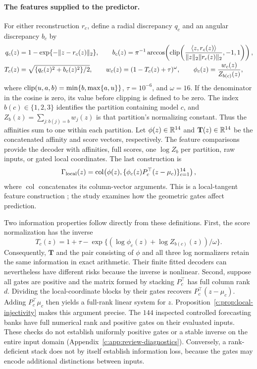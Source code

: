 \paragraph{The features supplied to the predictor.}
For either reconstruction $r_c$, define a radial discrepancy $q_c$ and an
angular discrepancy $b_c$ by
\begin{align}
 q_c(z)&=1-\exp\{-\|z-r_c(z)\|_2\},\qquad
 b_c(z)=\pi^{-1}\arccos\!\left(\operatorname{clip}\!\left(
 \frac{\langle z,r_c(z)\rangle}{\|z\|_2\|r_c(z)\|_2},-1,1\right)\right),
 \nonumber\\[-2pt]
 T_c(z)&=\sqrt{\{q_c(z)^2+b_c(z)^2\}/2},\qquad
 w_c(z)=(1-T_c(z)+\tau)^\omega,\qquad
 \phi_c(z)=\frac{w_c(z)}{Z_{b(c)}(z)},\label{c:eq:phi}
\end{align}
where $\operatorname{clip}(u,a,b)=\min\{b,\max\{a,u\}\}$, $\tau=10^{-6}$, and
$\omega=16$. If the denominator in the cosine is zero, its value before
clipping is defined to be zero. The index $b(c)\in\{1,2,3\}$ identifies
the partition containing model $c$, and
$Z_b(z)=\sum_{j:b(j)=b}w_j(z)$ is that partition's normalizing constant.
Thus the affinities sum to one within each partition. Let
$\phi(z)\in\mathbb{R}^{14}$ and $\mathbf T(z)\in\mathbb{R}^{14}$ be the concatenated
affinity and score vectors, respectively. The feature comparisons provide
the decoder with affinities, full scores, one $\log Z_b$ per partition,
raw inputs, or gated local coordinates. The last construction is
\begin{equation}\label{c:eq:local}
 \Gamma_{\rm local}(z)=
 \operatorname{col}\!\left(
 \phi(z),\{\phi_c(z)P_c^\top(z-\mu_c)\}_{c=1}^{14}\right),
\end{equation}
where $\operatorname{col}$ concatenates its column-vector arguments. This
is a local-tangent feature construction \citep{Yu2010LTC}; the study
examines how the geometric gates affect prediction.

Two information properties follow directly from these definitions. First,
the score normalization has the inverse
\begin{equation}\label{c:eq:inverse}
 T_c(z)=1+\tau-
 \exp\{(\log\phi_c(z)+\log Z_{b(c)}(z))/\omega\}.
\end{equation}
Consequently, $\mathbf T$ and the pair consisting of $\phi$ and all three
log normalizers retain the same information in exact arithmetic. Their
finite fitted decoders can nevertheless have different risks because the
inverse is nonlinear. Second, suppose all gates are positive and the
matrix formed by stacking $P_c^\top$ has full column rank $d$. Dividing
the local-coordinate blocks by their gates recovers $P_c^\top(z-\mu_c)$.
Adding $P_c^\top\mu_c$ then yields a full-rank linear system for $z$.
Proposition~\ref{c:prop:local-injectivity} makes this argument precise.
The $144$ inspected controlled forecasting banks have full numerical rank
and positive gates on their evaluated inputs. These checks do not establish
uniformly positive gates or a stable inverse on the entire input domain
(Appendix~\ref{c:app:review-diagnostics}). Conversely, a rank-deficient
stack does not by itself establish information loss, because the gates
may encode additional distinctions between inputs.

